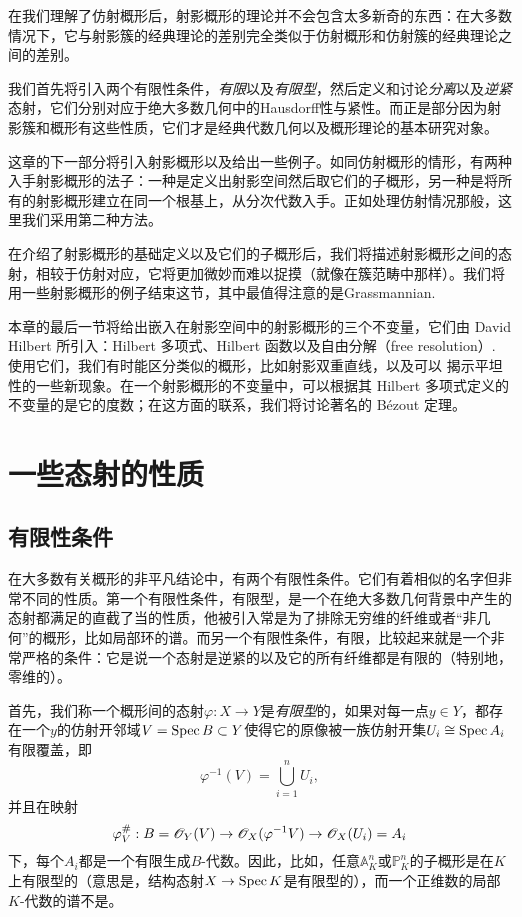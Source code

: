 在我们理解了仿射概形后，射影概形的理论并不会包含太多新奇的东西：在大多数情况下，它与射影簇的经典理论的差别完全类似于仿射概形和仿射簇的经典理论之间的差别。

我们首先将引入两个有限性条件，\textit{有限}以及\textit{有限型}，然后定义和讨论\textit{分离}以及\textit{逆紧}态射，它们分别对应于绝大多数几何中的Hausdorff性与紧性。而正是部分因为射影簇和概形有这些性质，它们才是经典代数几何以及概形理论的基本研究对象。

这章的下一部分将引入射影概形以及给出一些例子。如同仿射概形的情形，有两种入手射影概形的法子：一种是定义出射影空间然后取它们的子概形，另一种是将所有的射影概形建立在同一个根基上，从分次代数入手。正如处理仿射情况那般，这里我们采用第二种方法。

在介绍了射影概形的基础定义以及它们的子概形后，我们将描述射影概形之间的态射，相较于仿射对应，它将更加微妙而难以捉摸（就像在簇范畴中那样）。我们将用一些射影概形的例子结束这节，其中最值得注意的是Grassmannian.

本章的最后一节将给出嵌入在射影空间中的射影概形的三个不变量，它们由 David Hilbert 所引入：Hilbert 多项式、Hilbert 函数以及自由分解（free resolution）. 使用它们，我们有时能区分类似的概形，比如射影双重直线，以及可以
揭示平坦性的一些新现象。在一个射影概形的不变量中，可以根据其 Hilbert 多项式定义的不变量的是它的度数；在这方面的联系，我们将讨论著名的 B\'{e}zout 定理。

\section{一些态射的性质}\label{s:3.1}

\subsection{有限性条件}\label{s:3.1.1}

在大多数有关概形的非平凡结论中，有两个有限性条件。它们有着相似的名字但非常不同的性质。第一个有限性条件，有限型，是一个在绝大多数几何背景中产生的态射都满足的直截了当的性质，他被引入常是为了排除无穷维的纤维或者“非几何”的概形，比如局部环的谱。而另一个有限性条件，有限，比较起来就是一个非常严格的条件：它是说一个态射是逆紧的以及它的所有纤维都是有限的（特别地，零维的）。

首先，我们称一个概形间的态射$\varphi:X\to Y$是\textit{有限型}的，如果对每一点$y\in Y$，都存在一个$y$的仿射开邻域$V=\operatorname{Spec} B\subset Y$使得它的原像被一族仿射开集$U_i\cong \operatorname{Spec} A_i$有限覆盖，即
\[
	\varphi^{-1}(V)=\bigcup_{i=1}^n U_i,
\]
并且在映射
\[
	\varphi_V^\#:B=\mathscr{O}_Y(V)\to \mathscr{O}_X (\varphi^{-1}V)\to \mathscr{O}_X(U_i)=A_i
\]
下，每个$A_i$都是一个有限生成$B$\hyp 代数。因此，比如，任意$\mathbb{A}_K^n$或$\mathbb{P}_K^n$的子概形是在$K$上有限型的（意思是，结构态射$X\to \operatorname{Spec} K$是有限型的），而一个正维数的局部$K$\hyp 代数的谱不是。

